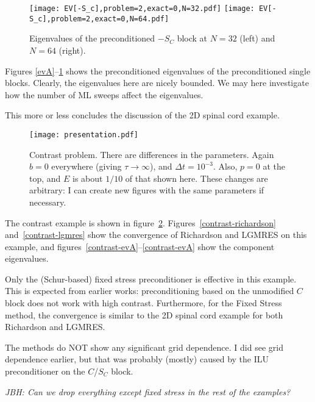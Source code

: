 \documentclass{article}
\begin{document}
\begin{figure}
\begin{center}
\texttt{[image: EV[-S\_c],problem=2,exact=0,N=32.pdf]}
\texttt{[image: EV[-S\_c],problem=2,exact=0,N=64.pdf]}
\caption{Eigenvalues of the preconditioned $-S_C$ block at $N=32$ (left) and $N=64$ (right).}
\label{evS}
\end{center}
\end{figure}

Figures \ref{evA}--\ref{evS} shows the preconditioned eigenvalues of the
preconditioned single blocks. Clearly, the eigenvalues here are nicely
bounded. We may here investigate how the number of ML sweeps affect the
eigenvalues.

This more or less concludes the discussion of the 2D spinal cord example. 

\FloatBarrier

\begin{figure}
\begin{center}
\texttt{[image: presentation.pdf]}
\caption{Contrast problem. There are differences in the parameters. Again $b=0$ everywhere (giving $\tau\rightarrow\infty$), and $\Delta t=10^{-3}$. Also, $p=0$ at the top, and $E$ is about $1/10$ of that shown here. These changes are arbitrary: I can create new figures with the same parameters if necessary.}
\label{contrast}
\end{center}
\end{figure}

The contrast example is shown in figure~\ref{contrast}. Figures~\ref{contrast-richardson} and~\ref{contrast-lgmres} show the convergence of Richardson and LGMRES on this example, and figures~\ref{contrast-evA}--\ref{contrast-evA} show the component eigenvalues.

Only the (Schur-based) fixed stress preconditioner is effective in this example. This is expected from earlier works: preconditioning based on the unmodified $C$ block does not work with high contrast. Furthermore, for the Fixed Stress method, the convergence is similar to the 2D spinal cord example for both Richardson and LGMRES.

The methods do NOT show any significant grid dependence. I did see grid dependence earlier, but that was probably (mostly) caused by the ILU preconditioner on the $C$/$S_C$ block.

\emph{JBH: Can we drop everything except fixed stress in the rest of the examples?}
\end{document}
